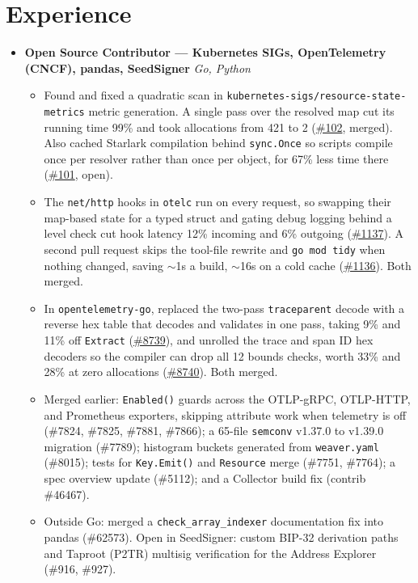 \documentclass[letterpaper,10.5pt]{article}
\newcommand{\resumeItem}[1]{
  \item\small{#1}
}
\newcommand{\resumeSubheading}[2]{
  \item[]
    \textbf{#1} \hfill \small\textit{#2}
}
\begin{document}
\section{Experience}
\begin{itemize}
  \resumeSubheading{Open Source Contributor --- Kubernetes SIGs, OpenTelemetry (CNCF), pandas, SeedSigner}{Go, Python}
  \begin{itemize}
    \resumeItem{Found and fixed a quadratic scan in \texttt{kubernetes-sigs/resource-state-metrics} metric generation. A single pass over the resolved map cut its running time 99\% and took allocations from 421 to 2 (\href{https://github.com/kubernetes-sigs/resource-state-metrics/pull/102}{\#102}, merged). Also cached Starlark compilation behind \texttt{sync.Once} so scripts compile once per resolver rather than once per object, for 67\% less time there (\href{https://github.com/kubernetes-sigs/resource-state-metrics/pull/101}{\#101}, open).}
    \resumeItem{The \texttt{net/http} hooks in \texttt{otelc} run on every request, so swapping their map-based state for a typed struct and gating debug logging behind a level check cut hook latency 12\% incoming and 6\% outgoing (\href{https://github.com/open-telemetry/opentelemetry-go-compile-instrumentation/pull/1137}{\#1137}). A second pull request skips the tool-file rewrite and \texttt{go mod tidy} when nothing changed, saving $\sim$1s a build, $\sim$16s on a cold cache (\href{https://github.com/open-telemetry/opentelemetry-go-compile-instrumentation/pull/1136}{\#1136}). Both merged.}
    \resumeItem{In \texttt{opentelemetry-go}, replaced the two-pass \texttt{traceparent} decode with a reverse hex table that decodes and validates in one pass, taking 9\% and 11\% off \texttt{Extract} (\href{https://github.com/open-telemetry/opentelemetry-go/pull/8739}{\#8739}), and unrolled the trace and span ID hex decoders so the compiler can drop all 12 bounds checks, worth 33\% and 28\% at zero allocations (\href{https://github.com/open-telemetry/opentelemetry-go/pull/8740}{\#8740}). Both merged.}
    \resumeItem{Merged earlier: \texttt{Enabled()} guards across the OTLP-gRPC, OTLP-HTTP, and Prometheus exporters, skipping attribute work when telemetry is off (\#7824, \#7825, \#7881, \#7866); a 65-file \texttt{semconv} v1.37.0 to v1.39.0 migration (\#7789); histogram buckets generated from \texttt{weaver.yaml} (\#8015); tests for \texttt{Key.Emit()} and \texttt{Resource} merge (\#7751, \#7764); a spec overview update (\#5112); and a Collector build fix (contrib \#46467).}
    \resumeItem{Outside Go: merged a \texttt{check\_array\_indexer} documentation fix into pandas (\#62573). Open in SeedSigner: custom BIP-32 derivation paths and Taproot (P2TR) multisig verification for the Address Explorer (\#916, \#927).}
  \end{itemize}
\end{itemize}
\end{document}
